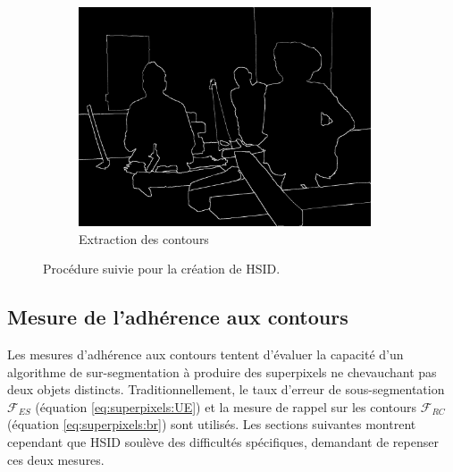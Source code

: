 \begin{figure}[htb]
\begin{subfigure}[t]{0.3\textwidth}
			\includegraphics[width=0.95\textwidth]{images/sur-segmentation/HSID/dataset_creation_step2}
		 \caption{Extraction des contours}
		 \label{fig:dataset_creation_step2}
	\end{subfigure}	
	\label{fig:dataset-creation}
	\caption{Procédure suivie pour la création de HSID.}
\end{figure}


\subsection{Mesure de l'adhérence aux contours}

Les mesures d'adhérence aux contours tentent d'évaluer la capacité d'un algorithme de sur-segmentation à produire des superpixels ne chevauchant pas deux objets distincts. Traditionnellement, le taux d'erreur de sous-segmentation $\mathcal{F}_{ES}$ (équation \ref{eq:superpixels:UE}) et la mesure de rappel sur les contours $\mathcal{F}_{RC}$ (équation \ref{eq:superpixels:br}) sont utilisés. Les sections suivantes montrent cependant que HSID soulève des difficultés spécifiques, demandant de repenser ces deux mesures.

